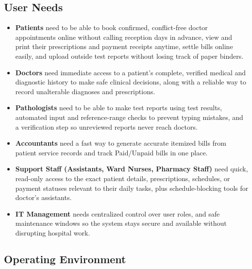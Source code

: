 \documentclass[11pt,a4paper]{article}
\begin{document}
\subsection{User Needs}
\begin{itemize}
    \item \textbf{Patients} need to be able to book confirmed, conflict-free doctor appointments online without calling reception days in advance, view and print their prescriptions and payment receipts anytime, settle bills online easily, and upload outside test reports without losing track of paper binders.

    \item \textbf{Doctors} need immediate access to a patient's complete, verified medical and diagnostic history to make safe clinical decisions, along with a reliable way to record unalterable diagnoses and prescriptions.

    \item \textbf{Pathologists} need to be able to make test reports using test results, automated input and reference-range checks to prevent typing mistakes, and a verification step so unreviewed reports never reach doctors.

    \item \textbf{Accountants} need a fast way to generate accurate itemized bills from patient service records and track Paid/Unpaid bills in one place.

    \item \textbf{Support Staff (Assistants, Ward Nurses, Pharmacy Staff)} need quick, read-only access to the exact patient details, prescriptions, schedules, or payment statuses relevant to their daily tasks, plus schedule-blocking tools for doctor's assistants.

    \item \textbf{IT Management} needs centralized control over user roles, and safe maintenance windows so the system stays secure and available without disrupting hospital work.
\end{itemize}

\subsection{Operating Environment}
\end{document}

